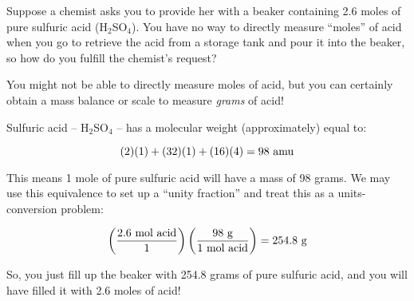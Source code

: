 

Suppose a chemist asks you to provide her with a beaker containing 2.6 moles of pure sulfuric acid (H$_{2}$SO$_{4}$).  You have no way to directly measure ``moles'' of acid when you go to retrieve the acid from a storage tank and pour it into the beaker, so how do you fulfill the chemist's request?







You might not be able to directly measure moles of acid, but you can certainly obtain a mass balance or scale to measure {\it grams} of acid!

\vskip 10pt

Sulfuric acid -- H$_{2}$SO$_{4}$ -- has a molecular weight (approximately) equal to:

$$(2)(1) + (32)(1) + (16)(4) = 98 \hbox{ amu}$$

This means 1 mole of pure sulfuric acid will have a mass of 98 grams.  We may use this equivalence to set up a ``unity fraction'' and treat this as a units-conversion problem:

$$\left( {2.6 \hbox{ mol acid} \over 1} \right) \left( {98 \hbox{ g} \over 1 \hbox{ mol acid}} \right) = 254.8 \hbox{ g}$$

So, you just fill up the beaker with 254.8 grams of pure sulfuric acid, and you will have filled it with 2.6 moles of acid!











